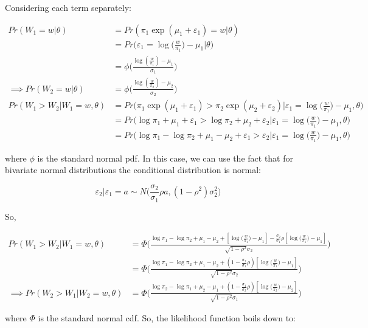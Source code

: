 \documentclass{article}
\begin{document}
\begin{enumerate}
\begin{enumerate}
Considering each term separately:

\begin{align*}
Pr(W_1 = w|\theta)
&= 
Pr(\pi_1\exp(\mu_1 + \varepsilon_1) = w |\theta)\\
&= 
Pr\Big(\varepsilon_1 = \log\Big(\frac{w}{\pi_1}\Big) - \mu_1 \Big|\theta\Big)\\
&= 
\phi\Bigg(\frac{\log(\frac{w}{\pi_1}) - \mu_1}{\sigma_1}\Bigg)\\
\implies
Pr(W_2 = w|\theta)
&= 
\phi\Bigg(\frac{\log(\frac{w}{\pi_2}) - \mu_2}{\sigma_2}\Bigg)\\
Pr(W_1 > W_2 | W_1 = w, \theta)
&= 
Pr\Big(\pi_1\exp(\mu_1 + \varepsilon_1) > \pi_2\exp(\mu_2 + \varepsilon_2) \Big| \varepsilon_1 = \log\Big(\frac{w}{\pi_1}\Big) - \mu_1, \theta\Big)\\
&= 
Pr\Big(\log \pi_1 + \mu_1 + \varepsilon_1 > \log\pi_2 + \mu_2 + \varepsilon_2 \Big| \varepsilon_1 = \log\Big(\frac{w}{\pi_1}\Big) - \mu_1, \theta\Big)\\
&= 
Pr\Big(\log \pi_1 - \log \pi_2 + \mu_1 -\mu_2 + \varepsilon_1 > \varepsilon_2 \Big| \varepsilon_1 = \log\Big(\frac{w}{\pi_1}\Big) - \mu_1, \theta\Big)
\end{align*}

where $\phi$ is the standard normal pdf.  In this case, we can use the fact that for bivariate normal distributions the conditional distribution is normal:

$$
\varepsilon_2 \Bigg| \varepsilon_1 = a \sim N\Bigg( \frac{\sigma_2}{\sigma_1}\rho a, (1-\rho^2)\sigma_2^2 \Bigg)
$$

So,

\begin{align*}
Pr(W_1 > W_2 | W_1 = w, \theta) 
&= \Phi\Bigg( \frac{\log \pi_1 - \log \pi_2 + \mu_1 -\mu_2 + [\log\Big(\frac{w}{\pi_1}\Big) - \mu_1] - \frac{\sigma_2}{\sigma_1}\rho[\log\Big(\frac{w}{\pi_1}\Big) - \mu_1]}{\sqrt{1- \rho^2} \sigma_2} \Bigg)\\
&= \Phi\Bigg( \frac{\log \pi_1 - \log \pi_2 + \mu_1 -\mu_2 + (1 - \frac{\sigma_2}{\sigma_1}\rho)[\log\Big(\frac{w}{\pi_1}\Big) - \mu_1]}{\sqrt{1- \rho^2} \sigma_2} \Bigg)\\
\implies
Pr(W_2 > W_1 | W_2 = w, \theta) 
&= \Phi\Bigg( \frac{\log \pi_2 - \log \pi_1 + \mu_2 -\mu_1 + (1 - \frac{\sigma_1}{\sigma_2}\rho)[\log\Big(\frac{w}{\pi_2}\Big) - \mu_2]}{\sqrt{1- \rho^2} \sigma_1} \Bigg)
\end{align*}

where $\Phi$ is the standard normal cdf.  So, the likelihood function boils down to:


\end{enumerate}
\end{enumerate}
\end{document}
